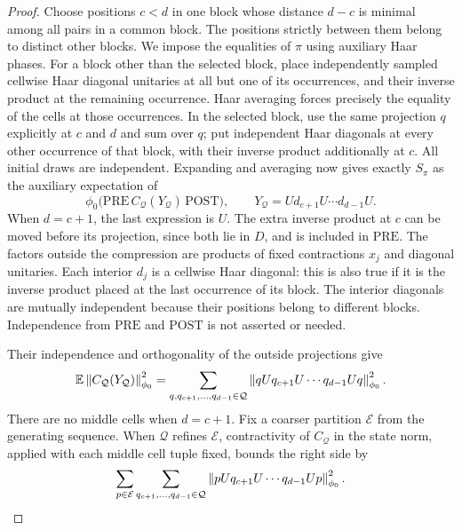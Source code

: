 \begin{proof}
Choose positions $c<d$ in one block whose distance $d-c$ is minimal
among all pairs in a common block. The positions strictly between them
belong to distinct other blocks. We impose the equalities of $\pi$
using auxiliary Haar phases. For a block other than the selected block,
place independently sampled cellwise Haar diagonal unitaries at all
but one of its occurrences, and their inverse product at the remaining
occurrence. Haar averaging forces precisely the equality of the cells
at those occurrences. In the selected block, use the same projection
$q$ explicitly at $c$ and $d$ and sum over $q$; put independent Haar
diagonals at every other occurrence of that block, with their inverse
product additionally at $c$. All initial draws are independent.
Expanding and averaging now gives exactly $S_\pi$ as the auxiliary
expectation of
\begin{equation}\label{exp:haar-compression}
 \phi_0\bigl(\mathrm{PRE}\,C_{\mathcal Q}(Y_{\mathcal Q})\,
                    \mathrm{POST}\bigr),\qquad
 Y_{\mathcal Q}=U d_{c+1}U\cdots d_{d-1}U.
\end{equation}
When $d=c+1$, the last expression is $U$. The extra inverse product at
$c$ can be moved before its projection, since both lie in $D$, and is
included in $\mathrm{PRE}$. The factors outside the compression are
products of fixed contractions $x_j$ and diagonal unitaries. Each
interior $d_j$ is a cellwise Haar diagonal: this is also true if it is
the inverse product placed at the last occurrence of its block. The
interior diagonals are mutually independent because their positions
belong to different blocks. Independence from $\mathrm{PRE}$ and
$\mathrm{POST}$ is not asserted or needed.

Their independence and orthogonality of the outside projections give
\begin{equation}\label{exp:haar-square-sum}
 \mathbb E\left\lVert C_{\mathcal Q}(Y_{\mathcal Q})\right\rVert_{\phi_0}^2
 =\sum_{q,q_{c+1},\ldots,q_{d-1}\in\mathcal Q}
   \left\lVert qUq_{c+1}U\cdots q_{d-1}Uq\right\rVert_{\phi_0}^2.
\end{equation}
There are no middle cells when $d=c+1$. Fix a coarser partition
$\mathcal E$ from the generating sequence. When $\mathcal Q$ refines
$\mathcal E$, contractivity of $C_{\mathcal Q}$ in the state norm,
applied with each middle cell tuple fixed, bounds the right side by
\begin{equation}\label{exp:coarse-square-sum}
 \sum_{p\in\mathcal E}
 \sum_{q_{c+1},\ldots,q_{d-1}\in\mathcal Q}
   \left\lVert pUq_{c+1}U\cdots q_{d-1}Up\right\rVert_{\phi_0}^2.
\end{equation}


\end{proof}
